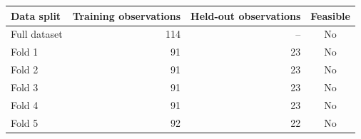 \begin{tabular}{lrrc}
\toprule
Data split & Training observations & Held-out observations & Feasible \\
\midrule
Full dataset & 114 & -- & No \\
Fold 1 & 91 & 23 & No \\
Fold 2 & 91 & 23 & No \\
Fold 3 & 91 & 23 & No \\
Fold 4 & 91 & 23 & No \\
Fold 5 & 92 & 22 & No \\
\bottomrule
\end{tabular}
